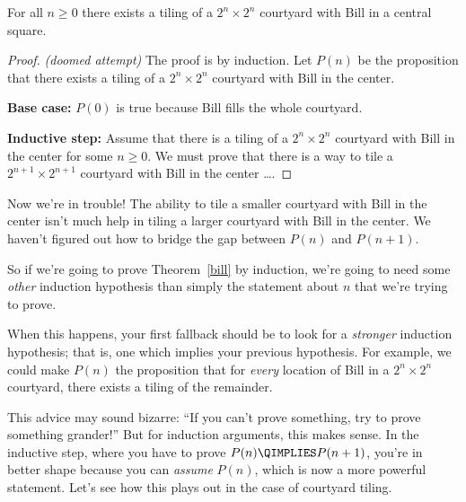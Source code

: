 \begin{theorem}\label{bill}
For all $n \geq 0$ there exists a tiling of a $2^n \times 2^n$
courtyard with Bill in a central square.
\end{theorem}

\begin{proof}
\emph{(doomed attempt)} The proof is by induction.  Let $P(n)$ be the
proposition that there exists a tiling of a $2^n \times 2^n$ courtyard
with Bill in the center.

\textbf{Base case:} $P(0)$ is true because Bill fills the whole courtyard.

\textbf{Inductive step:} Assume that there is a tiling of a
$2^n \times 2^n$ courtyard with Bill in the center for some $n \geq
0$.  We must prove that there is a way to tile a $2^{n+1} \times
2^{n+1}$ courtyard with Bill in the center \dots.
\end{proof}

Now we're in trouble!  The ability to tile a smaller courtyard with Bill
in the center isn't much help in tiling a larger courtyard with Bill in
the center.  We haven't figured out how to bridge the gap between $P(n)$
and $P(n+1)$.

So if we're going to prove Theorem~\ref{bill} by induction, we're going to
need some \emph{other} induction hypothesis than simply the statement
about $n$ that we're trying to prove.





When this happens, your first fallback should be to look for a
\emph{stronger} induction hypothesis; that is, one which implies
your previous hypothesis.  For example, we could make $P(n)$ the
proposition that for \emph{every} location of Bill in a $2^n \times
2^n$ courtyard, there exists a tiling of the remainder.

This advice may sound bizarre: ``If you can't prove something, try to
prove something grander!''  But for induction arguments, this makes sense.
In the inductive step, where you have to prove $P(n) \QIMPLIES P(n+1)$,
you're in better shape because you can \emph{assume} $P(n)$, which is now a
more powerful statement.  Let's see how this plays out in the case of
courtyard tiling.

